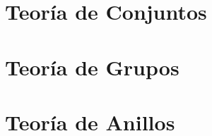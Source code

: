 \documentclass[b5paper,draft,10pt,fleqn,twoside]{book}
\begin{document}
\frontmatter

\clearpage
\tableofcontents
 

\mainmatter
\part{Teoría de Conjuntos}

\part{Teoría de Grupos}
\part{Teoría de Anillos}






\backmatter
\appendix

\printbibliography[
heading=bibintoc,
title={Referencias}
]
\end{document}
